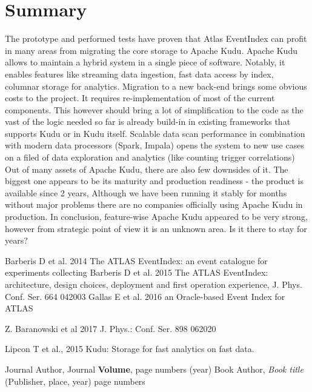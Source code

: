 \documentclass{webofc}
\begin{document}
\section{Summary}
\label{sec-7}
The prototype and performed tests have proven that Atlas EventIndex can profit in many areas from migrating the core storage to Apache Kudu.
Apache Kudu allows to maintain a hybrid system in a single piece of software. Notably, it enables features like streaming data ingestion, fast data access by index, columnar storage for analytics. 
Migration to a new back-end brings some obvious costs to the project. It requires re-implementation of most of the current components. This however should bring a lot of simplification to the code as the vast of the logic needed so far is already build-in in existing frameworks that supports Kudu or in Kudu itself. Scalable data scan performance in combination with modern data processors (Spark, Impala) opens the system to new use cases on a filed of data exploration and analytics (like counting trigger correlations) \newline
Out of many assets of Apache Kudu, there are also few downsides of it. The biggest one appears to be its maturity and production readiness - the product is available since 2 years, Although we have been running it stably for months without major problems there are no companies officially using Apache Kudu in production.
In conclusion, feature-wise Apache Kudu appeared to be very strong, however from strategic point of view it is an unknown area. Is it there to stay for years? 

\begin{thebibliography}{}

Barberis D et al. 2014 The ATLAS EventIndex: an event catalogue for experiments collecting 
Barberis D et al. 2015 The ATLAS EventIndex: architecture, design choices, deployment and first operation experience, J. Phys. Conf. Ser. 664 042003
Gallas E et al. 2016 an Oracle-based Event Index for ATLAS

Z. Baranowski et al 2017 J. Phys.: Conf. Ser. 898 062020

Lipcon T et al., 2015 Kudu: Storage for fast analytics on fast data.





Journal Author, Journal \textbf{Volume}, page numbers (year)
Book Author, \textit{Book title} (Publisher, place, year) page numbers
\end{thebibliography}
\end{document}
